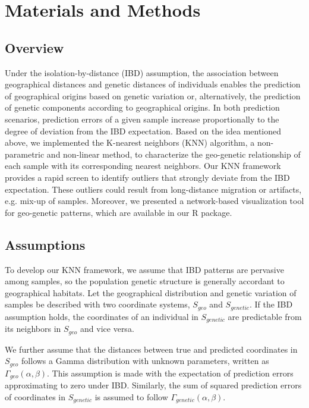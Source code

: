 \documentclass[11pt]{article}
\begin{document}
\section*{Materials and Methods}

\subsection*{Overview}

Under the isolation-by-distance (IBD) assumption, the association between geographical distances and genetic distances of individuals enables the prediction of geographical origins based on genetic variation or, alternatively, the prediction of genetic components according to geographical origins.
In both prediction scenarios, prediction errors of a given sample increase proportionally to the degree of deviation from the IBD expectation.
Based on the idea mentioned above, we implemented the K-nearest neighbors (KNN) algorithm, a non-parametric and non-linear method, to characterize the geo-genetic relationship of each sample with its corresponding nearest neighbors.
Our KNN framework provides a rapid screen to identify outliers that strongly deviate from the IBD expectation.
These outliers could result from long-distance migration or artifacts, e.g. mix-up of samples.
Moreover, we presented a network-based visualization tool for geo-genetic patterns, which are available in our R package.

\subsection*{Assumptions}

To develop our KNN framework, we assume that IBD patterns are pervasive among samples, so the population genetic structure is generally accordant to geographical habitats.
Let the geographical distribution and genetic variation of samples be described with two coordinate systems, $S_{geo}$ and $S_{genetic}$.
If the IBD assumption holds, the coordinates of an individual in $S_{genetic}$ are predictable from its neighbors in $S_{geo}$ and vice versa.

We further assume that the distances between true and predicted coordinates in $S_{geo}$ follows a Gamma distribution with unknown parameters, written as $\Gamma_{geo}(\alpha,\beta)$. 
This assumption is made with the expectation of prediction errors approximating to zero under IBD.
Similarly, the sum of squared prediction errors of coordinates in $S_{genetic}$ is assumed to follow $\Gamma_{genetic}(\alpha,\beta)$.
\end{document}
